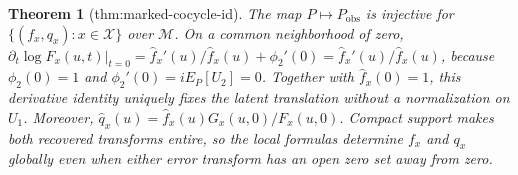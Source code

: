 \documentclass{article}
\newtheorem{theorem}{Theorem}
\begin{document}
\begin{theorem}[thm:marked-cocycle-id]\label{thm:marked-cocycle-id}
The map \(P\mapsto P_{\mathrm{obs}}\) is injective for \(\{(f_x,q_x):x\in\mathcal X\}\) over \(\mathcal M\). On a common neighborhood of zero, \(\left.\partial_t\log F_x(u,t)\right|_{t=0}=\widehat f_x'(u)/\widehat f_x(u)+\phi_2'(0)=\widehat f_x'(u)/\widehat f_x(u)\), because \(\phi_2(0)=1\) and \(\phi_2'(0)=iE_P[U_2]=0\). Together with \(\widehat f_x(0)=1\), this derivative identity uniquely fixes the latent translation without a normalization on \(U_1\). Moreover, \(\widehat q_x(u)=\widehat f_x(u)G_x(u,0)/F_x(u,0)\). Compact support makes both recovered transforms entire, so the local formulas determine \(f_x\) and \(q_x\) globally even when either error transform has an open zero set away from zero.
\end{theorem}
\end{document}
